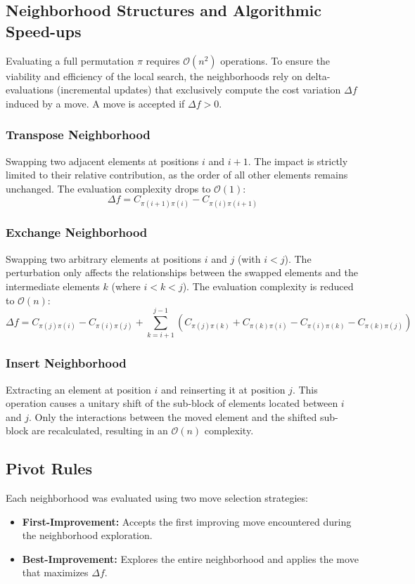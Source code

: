 \documentclass[11pt, a4paper]{article}
\begin{document}
\subsection{Neighborhood Structures and Algorithmic Speed-ups}
Evaluating a full permutation $\pi$ requires $\mathcal{O}(n^2)$ operations. To ensure the viability and efficiency of the local search, the neighborhoods rely on delta-evaluations (incremental updates) that exclusively compute the cost variation $\Delta f$ induced by a move. A move is accepted if $\Delta f > 0$.

\subsubsection{Transpose Neighborhood}
Swapping two adjacent elements at positions $i$ and $i+1$. The impact is strictly limited to their relative contribution, as the order of all other elements remains unchanged. The evaluation complexity drops to $\mathcal{O}(1)$:
\begin{equation}
\Delta f = C_{\pi(i+1)\pi(i)} - C_{\pi(i)\pi(i+1)}
\end{equation}

\subsubsection{Exchange Neighborhood}
Swapping two arbitrary elements at positions $i$ and $j$ (with $i < j$). The perturbation only affects the relationships between the swapped elements and the intermediate elements $k$ (where $i < k < j$). The evaluation complexity is reduced to $\mathcal{O}(n)$:
\begin{equation}
\Delta f = C_{\pi(j)\pi(i)} - C_{\pi(i)\pi(j)} + \sum_{k=i+1}^{j-1} \left( C_{\pi(j)\pi(k)} + C_{\pi(k)\pi(i)} - C_{\pi(i)\pi(k)} - C_{\pi(k)\pi(j)} \right)
\end{equation}

\subsubsection{Insert Neighborhood}
Extracting an element at position $i$ and reinserting it at position $j$. This operation causes a unitary shift of the sub-block of elements located between $i$ and $j$. Only the interactions between the moved element and the shifted sub-block are recalculated, resulting in an $\mathcal{O}(n)$ complexity.

\subsection{Pivot Rules}
Each neighborhood was evaluated using two move selection strategies:
\begin{itemize}
    \item \textbf{First-Improvement:} Accepts the first improving move encountered during the neighborhood exploration.
    \item \textbf{Best-Improvement:} Explores the entire neighborhood and applies the move that maximizes $\Delta f$.
\end{itemize}
\end{document}
